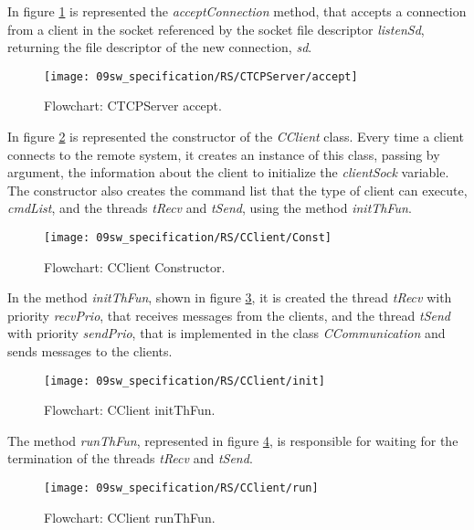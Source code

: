 In figure \ref{fig:acceptConn} is represented the \textit{acceptConnection} method, that accepts a connection from a client in the socket referenced by the socket file descriptor \textit{listenSd}, returning the file descriptor of the new connection, \textit{sd}.

\begin{figure}[H]
	\centering
	\texttt{[image: 09sw\_specification/RS/CTCPServer/accept]}
	\caption{Flowchart: CTCPServer accept.}
	\label{fig:acceptConn}
\end{figure}


In figure \ref{fig:ClientConst} is represented the constructor of the \textit{CClient} class. Every time a client connects to the remote system, it creates an instance of this class, passing by argument, the information about the client to initialize the \textit{clientSock} variable. The constructor also creates the command list that the type of client can execute, \textit{cmdList}, and the threads \textit{tRecv} and \textit{tSend}, using the method \textit{initThFun}.

\begin{figure}[H]
	\centering
	\texttt{[image: 09sw\_specification/RS/CClient/Const]}
	\caption{Flowchart: CClient Constructor.}
	\label{fig:ClientConst}
\end{figure}

In the method \textit{initThFun}, shown in figure \ref{fig:clientInit}, it is created the thread \textit{tRecv} with priority \textit{recvPrio}, that receives messages from the clients, and the thread \textit{tSend} with priority \textit{sendPrio}, that is implemented in the class \textit{CCommunication} and sends messages to the clients.

\begin{figure}[H]
	\centering
	\texttt{[image: 09sw\_specification/RS/CClient/init]}
	\caption{Flowchart: CClient initThFun.}
	\label{fig:clientInit}
\end{figure}

The method \textit{runThFun}, represented in figure \ref{fig:clientRun}, is responsible for waiting for the termination of the threads \textit{tRecv} and \textit{tSend}.

\begin{figure}[H]
	\centering
	\texttt{[image: 09sw\_specification/RS/CClient/run]}
	\caption{Flowchart: CClient runThFun.}
	\label{fig:clientRun}
\end{figure}

